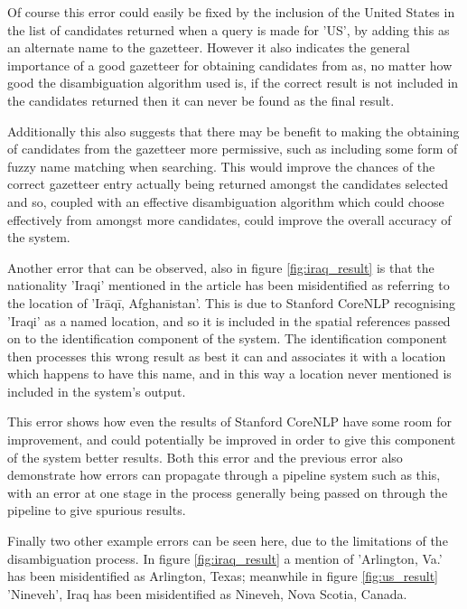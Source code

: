 \documentclass[12pt, a4paper]{report}
\begin{document}
Of course this error could easily be fixed by the inclusion of the United States in the list of candidates returned when a query is made for 'US', by adding this as an alternate name to the gazetteer. However it also indicates the general importance of a good gazetteer for obtaining candidates from as, no matter how good the disambiguation algorithm used is, if the correct result is not included in the candidates returned then it can never be found as the final result.

Additionally this also suggests that there may be benefit to making the obtaining of candidates from the gazetteer more permissive, such as including some form of fuzzy name matching when searching. This would improve the chances of the correct gazetteer entry actually being returned amongst the candidates selected and so, coupled with an effective disambiguation algorithm which could choose effectively from amongst more candidates, could improve the overall accuracy of the system.

 


Another error that can be observed, also in figure \ref{fig:iraq_result} is that the nationality 'Iraqi' mentioned in the article has been misidentified as referring to the location of 'Irāqī, Afghanistan'. This is due to Stanford CoreNLP recognising 'Iraqi' as a named location, and so it is included in the spatial references passed on to the identification component of the system. The identification component then processes this wrong result as best it can and associates it with a location which happens to have this name, and in this way a location never mentioned is included in the system's output.

This error shows how even the results of Stanford CoreNLP have some room for improvement, and could potentially be improved in order to give this component of the system better results. Both this error and the previous error also demonstrate how errors can propagate through a pipeline system such as this, with an error at one stage in the process generally being passed on through the pipeline to give spurious results.

Finally two other example errors can be seen here, due to the limitations of the disambiguation process. In figure \ref{fig:iraq_result} a mention of 'Arlington, Va.' has been misidentified as Arlington, Texas; meanwhile in figure \ref{fig:us_result} 'Nineveh', Iraq has been misidentified as Nineveh, Nova Scotia, Canada.
\end{document}
